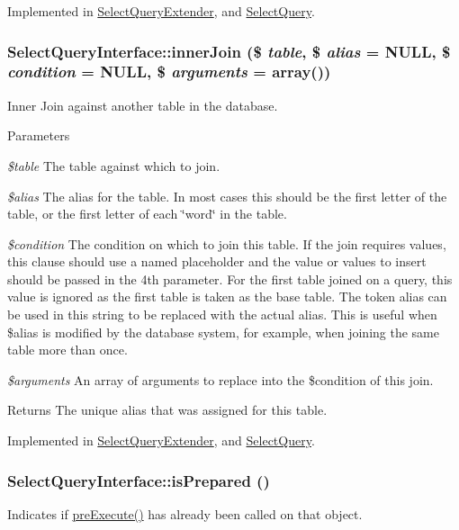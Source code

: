 Implemented in \hyperlink{classSelectQueryExtender_a33ac4aade6da091ee121cd442f32c5a2}{SelectQueryExtender}, and \hyperlink{classSelectQuery_a99fb631e9ddd64677d84c9e60855a6f7}{SelectQuery}.\hypertarget{interfaceSelectQueryInterface_ab359fd116625504a297d7fd4222f2564}{
\subsubsection[{innerJoin}]{\setlength{\rightskip}{0pt plus 5cm}SelectQueryInterface::innerJoin (\$ {\em table}, \/  \$ {\em alias} = {\ttfamily NULL}, \/  \$ {\em condition} = {\ttfamily NULL}, \/  \$ {\em arguments} = {\ttfamily array()})}}
\label{interfaceSelectQueryInterface_ab359fd116625504a297d7fd4222f2564}
Inner Join against another table in the database.


\begin{DoxyParams}{Parameters}
\item[{\em \$table}]The table against which to join. \item[{\em \$alias}]The alias for the table. In most cases this should be the first letter of the table, or the first letter of each \char`\"{}word\char`\"{} in the table. \item[{\em \$condition}]The condition on which to join this table. If the join requires values, this clause should use a named placeholder and the value or values to insert should be passed in the 4th parameter. For the first table joined on a query, this value is ignored as the first table is taken as the base table. The token alias can be used in this string to be replaced with the actual alias. This is useful when \$alias is modified by the database system, for example, when joining the same table more than once. \item[{\em \$arguments}]An array of arguments to replace into the \$condition of this join. \end{DoxyParams}
\begin{DoxyReturn}{Returns}
The unique alias that was assigned for this table. 
\end{DoxyReturn}


Implemented in \hyperlink{classSelectQueryExtender_a4c37ec31ec8dce6287cb5d211886b23e}{SelectQueryExtender}, and \hyperlink{classSelectQuery_a2e3bad44c2eca1e74130622a93fdc394}{SelectQuery}.\hypertarget{interfaceSelectQueryInterface_a04f6707fd382218aef1443a9facbc9f2}{
\subsubsection[{isPrepared}]{\setlength{\rightskip}{0pt plus 5cm}SelectQueryInterface::isPrepared ()}}
\label{interfaceSelectQueryInterface_a04f6707fd382218aef1443a9facbc9f2}
Indicates if \hyperlink{interfaceSelectQueryInterface_a6e495fdb26a9b6a8752f381552140fa7}{preExecute()} has already been called on that object.


